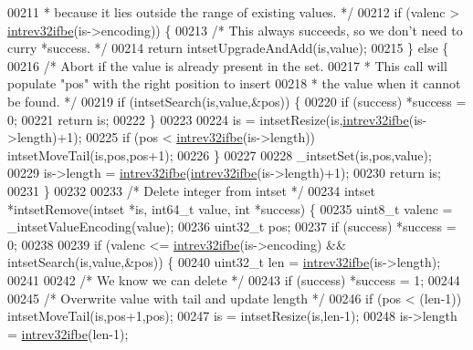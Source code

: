 \begin{DoxyCode}
00211 \textcolor{comment}{     * because it lies outside the range of existing values. */}
00212     \textcolor{keywordflow}{if} (valenc > \hyperlink{endianconv_8h_a4e85d9ae58a3b1e6ceaabfd4689002c7}{intrev32ifbe}(is->encoding)) \{
00213         \textcolor{comment}{/* This always succeeds, so we don't need to curry *success. */}
00214         \textcolor{keywordflow}{return} intsetUpgradeAndAdd(is,value);
00215     \} \textcolor{keywordflow}{else} \{
00216         \textcolor{comment}{/* Abort if the value is already present in the set.}
00217 \textcolor{comment}{         * This call will populate "pos" with the right position to insert}
00218 \textcolor{comment}{         * the value when it cannot be found. */}
00219         \textcolor{keywordflow}{if} (intsetSearch(is,value,&pos)) \{
00220             \textcolor{keywordflow}{if} (success) *success = 0;
00221             \textcolor{keywordflow}{return} is;
00222         \}
00223 
00224         is = intsetResize(is,\hyperlink{endianconv_8h_a4e85d9ae58a3b1e6ceaabfd4689002c7}{intrev32ifbe}(is->length)+1);
00225         \textcolor{keywordflow}{if} (pos < \hyperlink{endianconv_8h_a4e85d9ae58a3b1e6ceaabfd4689002c7}{intrev32ifbe}(is->length)) intsetMoveTail(is,pos,pos+1);
00226     \}
00227 
00228     \_intsetSet(is,pos,value);
00229     is->length = \hyperlink{endianconv_8h_a4e85d9ae58a3b1e6ceaabfd4689002c7}{intrev32ifbe}(\hyperlink{endianconv_8h_a4e85d9ae58a3b1e6ceaabfd4689002c7}{intrev32ifbe}(is->length)+1);
00230     \textcolor{keywordflow}{return} is;
00231 \}
00232 
00233 \textcolor{comment}{/* Delete integer from intset */}
00234 intset *intsetRemove(intset *is, int64\_t value, \textcolor{keywordtype}{int} *success) \{
00235     uint8\_t valenc = \_intsetValueEncoding(value);
00236     uint32\_t pos;
00237     \textcolor{keywordflow}{if} (success) *success = 0;
00238 
00239     \textcolor{keywordflow}{if} (valenc <= \hyperlink{endianconv_8h_a4e85d9ae58a3b1e6ceaabfd4689002c7}{intrev32ifbe}(is->encoding) && intsetSearch(is,value,&pos)) \{
00240         uint32\_t len = \hyperlink{endianconv_8h_a4e85d9ae58a3b1e6ceaabfd4689002c7}{intrev32ifbe}(is->length);
00241 
00242         \textcolor{comment}{/* We know we can delete */}
00243         \textcolor{keywordflow}{if} (success) *success = 1;
00244 
00245         \textcolor{comment}{/* Overwrite value with tail and update length */}
00246         \textcolor{keywordflow}{if} (pos < (len-1)) intsetMoveTail(is,pos+1,pos);
00247         is = intsetResize(is,len-1);
00248         is->length = \hyperlink{endianconv_8h_a4e85d9ae58a3b1e6ceaabfd4689002c7}{intrev32ifbe}(len-1);

\end{DoxyCode}
